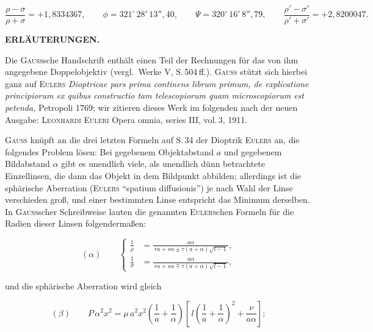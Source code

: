 \documentclass[10pt,a4paper]{article}
\begin{document}
\[
\frac{\rho-\sigma}{\rho+\sigma} = +1{,}8334367, \qquad
\phi = 321^{\circ}\,28'\,13''{,}40, \qquad
\Psi = 320^{\circ}\,16'\,8''{,}79, \qquad
\frac{\rho'-\sigma'}{\rho'+\sigma'} = +2{,}8200047.
\]
\medskip

\begin{center}\textbf{\Large ERL\"AUTERUNGEN.}\end{center}

\noindent Die \textsc{Gauss}sche Handschrift enth\"alt einen Teil der
Rechnungen f\"ur das von ihm angegebene Doppelobjektiv
(vergl.\ Werke V, S.\,504\,ff.). \textsc{Gauss} st\"utzt sich hierbei
ganz auf \textsc{Eulers} \textit{Dioptricae pars prima continens librum primum,
de explicatione principiorum ex quibus constructio tam telescopiorum quam
microscopiorum est petenda,} Petropoli 1769; wir zitieren dieses Werk im
folgenden nach der neuen Ausgabe:
\textsc{Leonhardi Euleri} Opera omnia, series III, vol.\,3, 1911.

\smallskip
\textsc{Gauss} kn\"upft an die drei letzten Formeln auf S.\,34 der
Dioptrik \textsc{Eulers} an, die folgendes Problem l\"osen: Bei
gegebenem Objektabstand $a$ und gegebenem Bildabstand $\alpha$ gibt es
unendlich viele, als unendlich d\"unn betrachtete Einzellinsen, die
dann das Objekt in dem Bildpunkt abbilden; allerdings ist die
sph\"arische Aberration (\textsc{Eulers} \enquote{spatium diffusionis})
je nach Wahl der Linse verschieden gro\ss, und einer bestimmten
Linse entspricht das Minimum derselben. In \textsc{Gauss}scher
Schreibweise lauten die genannten \textsc{Eulers}chen Formeln f\"ur die
Radien dieser Linsen folgenderma\ss en:

\begin{equation}
(\alpha)\qquad
\left\{\begin{aligned}
\frac{1}{\rho} &= \frac{a\alpha}{\,r a + s\alpha \pm \tau (a+\alpha)\sqrt{l-1}\,},\\[4pt]
\frac{1}{\sigma} &= \frac{a\alpha}{\,r a + s\alpha \mp \tau (a+\alpha)\sqrt{l-1}\,},
\end{aligned}\right.
\end{equation}

und die sph\"arische Aberration wird gleich

\begin{equation}
(\beta)\qquad
P\,\alpha^{2}x^{2}
= \mu\,a^{2}x^{2}\!\left(\frac{1}{a}+\frac{1}{\alpha}\right)\!
  \left[\,l\!\left(\frac{1}{a}+\frac{1}{\alpha}\right)^{\!2}+\frac{\nu}{a\alpha}\right];
\end{equation}
\end{document}

